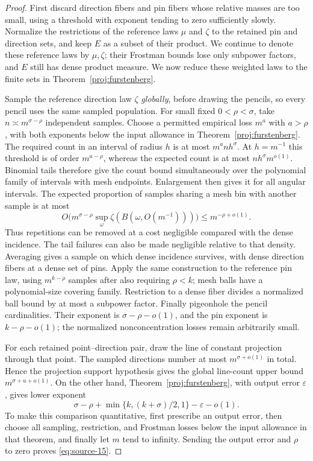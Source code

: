 \begin{proof}
First discard direction fibers and pin fibers whose relative masses are
too small, using a threshold with exponent tending to zero sufficiently
slowly. Normalize the restrictions of the reference laws $\mu$ and
$\zeta$ to the retained pin and direction sets, and keep $E$ as a
subset of their product. We continue to denote these reference laws by
$\mu,\zeta$; their Frostman bounds lose only subpower factors, and $E$
still has dense product measure. We now reduce these weighted laws to
the finite sets in Theorem~\ref{proj:furstenberg}.

Sample the reference direction law $\zeta$ \emph{globally}, before
drawing the pencils, so every pencil uses the same sampled population.
For small fixed $0<\rho<\sigma$, take
$n\asymp m^{\sigma-\rho}$ independent samples. Choose a permitted
empirical loss $m^a$ with $a>\rho$, with both exponents below the
input allowance in Theorem~\ref{proj:furstenberg}. The required count
in an interval of radius $h$ is at most $m^a n h^\sigma$.
At $h=m^{-1}$ this threshold is of order $m^{a-\rho}$, whereas
the expected count is at most $n h^\sigma m^{o(1)}$.
Binomial tails therefore give the count bound simultaneously over
the polynomial family of intervals with mesh endpoints. Enlargement
then gives it for all angular intervals. The expected proportion of
samples sharing a mesh bin with another sample is at most
\[
 O\bigl(m^{\sigma-\rho}\sup_\omega
             \zeta(B(\omega,O(m^{-1})))\bigr)
 \le m^{-\rho+o(1)}.
\]
Thus repetitions can be removed at a cost negligible compared with
the dense incidence. The tail failures can also be made negligible
relative to that density. Averaging gives a sample on which dense
incidence survives, with dense direction fibers at a dense set of
pins. Apply the same construction to the reference pin law, using
$m^{k-\rho}$ samples after also requiring $\rho<k$; mesh balls have
a polynomial-size covering family. Restriction to a dense fiber
divides a normalized ball bound by at most a subpower factor.
Finally pigeonhole the pencil cardinalities. Their exponent is
$\sigma-\rho-o(1)$, and the pin exponent is $k-\rho-o(1)$;
the normalized nonconcentration losses remain arbitrarily small.

For each retained point--direction pair, draw the line of constant
projection through that point. The sampled directions number at most
$m^{\sigma+o(1)}$ in total. Hence the projection support hypothesis gives
the global line-count upper bound $m^{\sigma+u+o(1)}$. On the other
hand, Theorem~\ref{proj:furstenberg}, with output error
$\varepsilon$, gives lower exponent
\[
 \sigma-\rho+\min\{k,(k+\sigma)/2,1\}-\varepsilon-o(1).
\]
To make this comparison quantitative, first prescribe an output error,
then choose all sampling, restriction, and Frostman losses below the
input allowance in that theorem, and finally let $m$ tend to infinity.
Sending the output error and $\rho$ to zero proves
\eqref{eq:source-15}.


\end{proof}

